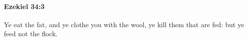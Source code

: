 
		\paragraph{Ezekiel 34:3} %
			\label{EZEKIEL-34-3}

			Ye eat the fat, and ye clothe you with the wool, ye kill them that are fed: but ye feed not the flock.


